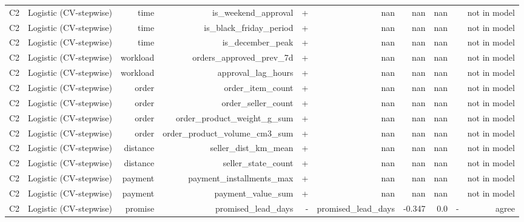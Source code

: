 \begin{table}[htbp]
\begin{tabular}{lrrrrrrrrr}
C2 & Logistic (CV-stepwise) & time & is\_weekend\_approval & + & nan & nan & nan &  & not in model \\
C2 & Logistic (CV-stepwise) & time & is\_black\_friday\_period & + & nan & nan & nan &  & not in model \\
C2 & Logistic (CV-stepwise) & time & is\_december\_peak & + & nan & nan & nan &  & not in model \\
C2 & Logistic (CV-stepwise) & workload & orders\_approved\_prev\_7d & + & nan & nan & nan &  & not in model \\
C2 & Logistic (CV-stepwise) & workload & approval\_lag\_hours & + & nan & nan & nan &  & not in model \\
C2 & Logistic (CV-stepwise) & order & order\_item\_count & + & nan & nan & nan &  & not in model \\
C2 & Logistic (CV-stepwise) & order & order\_seller\_count & + & nan & nan & nan &  & not in model \\
C2 & Logistic (CV-stepwise) & order & order\_product\_weight\_g\_sum & + & nan & nan & nan &  & not in model \\
C2 & Logistic (CV-stepwise) & order & order\_product\_volume\_cm3\_sum & + & nan & nan & nan &  & not in model \\
C2 & Logistic (CV-stepwise) & distance & seller\_dist\_km\_mean & + & nan & nan & nan &  & not in model \\
C2 & Logistic (CV-stepwise) & distance & seller\_state\_count & + & nan & nan & nan &  & not in model \\
C2 & Logistic (CV-stepwise) & payment & payment\_installments\_max & + & nan & nan & nan &  & not in model \\
C2 & Logistic (CV-stepwise) & payment & payment\_value\_sum & + & nan & nan & nan &  & not in model \\
C2 & Logistic (CV-stepwise) & promise & promised\_lead\_days & - & promised\_lead\_days & -0.347 & 0.0 & - & agree \\
\bottomrule
\end{tabular}
\par\smallskip\begin{minipage}{\linewidth}\footnotesize \end{minipage}
\end{table}

